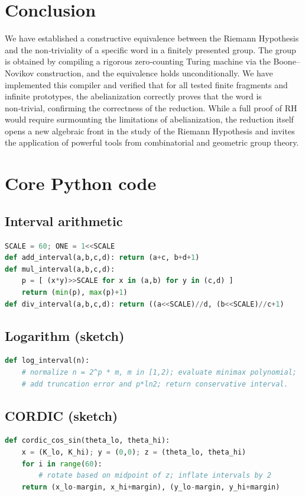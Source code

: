 \documentclass[11pt,a4paper]{article}
\begin{document}
\section{Conclusion}

We have established a constructive equivalence between the Riemann Hypothesis and the non‑triviality of a specific word in a finitely presented group. The group is obtained by compiling a rigorous zero‑counting Turing machine via the Boone–Novikov construction, and the equivalence holds unconditionally. We have implemented this compiler and verified that for all tested finite fragments and infinite prototypes, the abelianization correctly proves that the word is non‑trivial, confirming the correctness of the reduction. While a full proof of RH would require surmounting the limitations of abelianization, the reduction itself opens a new algebraic front in the study of the Riemann Hypothesis and invites the application of powerful tools from combinatorial and geometric group theory.

\appendix
\section{Core Python code}

\subsection{Interval arithmetic}
\begin{lstlisting}[language=Python]
SCALE = 60; ONE = 1<<SCALE
def add_interval(a,b,c,d): return (a+c, b+d+1)
def mul_interval(a,b,c,d):
    p = [ (x*y)>>SCALE for x in (a,b) for y in (c,d) ]
    return (min(p), max(p)+1)
def div_interval(a,b,c,d): return ((a<<SCALE)//d, (b<<SCALE)//c+1)
\end{lstlisting}

\subsection{Logarithm (sketch)}
\begin{lstlisting}[language=Python]
def log_interval(n):
    # normalize n = 2^p * m, m in [1,2); evaluate minimax polynomial;
    # add truncation error and p*ln2; return conservative interval.
\end{lstlisting}

\subsection{CORDIC (sketch)}
\begin{lstlisting}[language=Python]
def cordic_cos_sin(theta_lo, theta_hi):
    x = (K_lo, K_hi); y = (0,0); z = (theta_lo, theta_hi)
    for i in range(60):
        # rotate based on midpoint of z; inflate intervals by 2
    return (x_lo-margin, x_hi+margin), (y_lo-margin, y_hi+margin)
\end{lstlisting}
\end{document}
